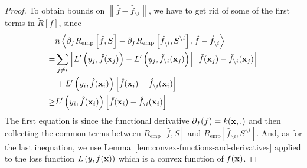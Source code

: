 \begin{proof}
	To obtain bounds on \(\left\|\hat{f}-\hat{f}_{\backslash i}\right\|\), we have to get rid of some of the first terms in \(\tilde{R}[f]\), since
	\begin{equation}
		\begin{aligned}
			     & n\left\langle\partial_{f}R_{\text{emp}}\left[\hat{f},S\right]-\partial_{f}R_{\text{emp}}\left[\hat{f}_{\backslash i},S^{\backslash i}\right],\hat{f}-\hat{f}_{\backslash i}\right\rangle               \\
			=    & \sum_{j\neq i}\left[L^{\prime}\left(y_{j},\hat{f}(\mathbf{x}_{j})\right)-L^{\prime}\left(y_{j},\hat{f}_{\backslash i}(\mathbf{x}_{j})\right)\right]\left[\hat{f}(\mathbf{x}_{j})-\hat{f}_{\backslash i}(\mathbf{x}_{j})\right] \\
			     & +L^{\prime}\left(y_{i},\hat{f}(\mathbf{x}_{i})\right)\left[\hat{f}(\mathbf{x}_{i})-\hat{f}_{\backslash i}(\mathbf{x}_{i})\right]                                                                                         \\
			\geq & L^{\prime}\left(y_{i},\hat{f}(\mathbf{x}_{i})\right)\left[\hat{f}(\mathbf{x}_{i})-\hat{f}_{\backslash i}(\mathbf{x}_{i})\right]
		\end{aligned}
	\end{equation}
	The first equation is since the functional derivative \(\partial_{f}(f)=k(\mathbf{x},.)\) and then collecting the common terms between \(R_{\text{emp}}\left[\hat{f}, S\right]\) and \(R_{\text{emp}}\left[\hat{f}_{\backslash i}, S^{\backslash i}\right]\). And, as for the last inequation, we use Lemma~\ref{lem:convex-functions-and-derivatives} applied to the loss function \(L\left(y,f(\mathbf{x})\right)\) which is a convex function of \(f(\mathbf{x})\).


\end{proof}
